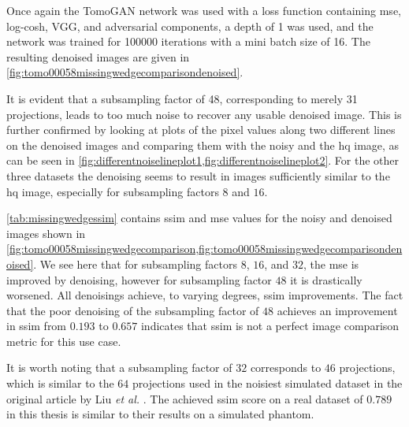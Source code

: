 Once again the TomoGAN network was used with a loss function containing \gls{mse}, log-cosh, VGG, and adversarial components, a depth of 1 was used, and the network was trained for 100000 iterations with a mini batch size of 16. The resulting denoised images are given in \cref{fig:tomo00058missingwedgecomparisondenoised}. 

It is evident that a subsampling factor of 48, corresponding to merely 31 projections, leads to too much noise to recover any usable denoised image. This is further confirmed by looking at plots of the pixel values along two different lines on the denoised images and comparing them with the noisy and the \gls{hq} image, as can be seen in \cref{fig:differentnoiselineplot1,fig:differentnoiselineplot2}. For the other three datasets the denoising seems to result in images sufficiently similar to the \gls{hq} image, especially for subsampling factors $8$ and $16$. 

\cref{tab:missingwedgessim} contains \gls{ssim} and \gls{mse} values for the noisy and denoised images shown in \cref{fig:tomo00058missingwedgecomparison,fig:tomo00058missingwedgecomparisondenoised}. We see here that for subsampling factors $8$, $16$, and $32$, the \gls{mse} is improved by denoising, however for subsampling factor $48$ it is drastically worsened. All denoisings achieve, to varying degrees, \gls{ssim} improvements. The fact that the poor denoising of the subsampling factor of $48$ achieves an improvement in \gls{ssim} from $0.193$ to $0.657$ indicates that \gls{ssim} is not a perfect image comparison metric for this use case. 

It is worth noting that a subsampling factor of $32$ corresponds to $46$ projections, which is similar to the $64$ projections used in the noisiest simulated dataset in the original article by Liu \textit{et al.} \cite{liu2020tomogan}. The achieved \gls{ssim} score on a real dataset of $0.789$ in this thesis is similar to their results on a simulated phantom. 


